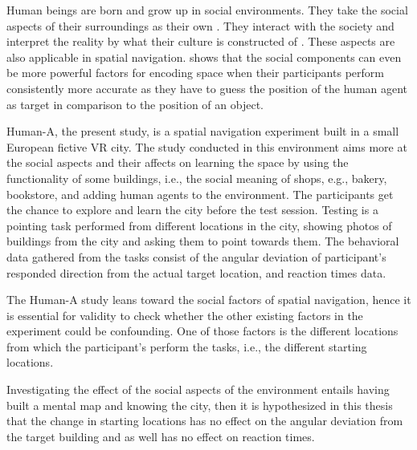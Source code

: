 Human beings are born and grow up in social environments. They take the social aspects of their surroundings as their own \autocite{berger1967luckman}. They interact with the society and interpret the reality by what their culture is constructed of \autocite{SIEGEL19759}. These aspects are also applicable in spatial navigation. \textcite{kuehn2018social} shows that the social components can even be more powerful factors for encoding space when their participants perform consistently more accurate as they have to guess the position of the human agent as target in comparison to the position of an object.

Human-A, the present study, is a spatial navigation experiment built in a small European fictive VR city. The study conducted in this environment aims more at the social aspects and their affects on learning the space by using the functionality of some buildings, i.e., the social meaning of shops, e.g., bakery, bookstore, and adding human agents to the environment. The participants get the chance to explore and learn the city before the test session. Testing is a pointing task performed from different locations in the city, showing photos of buildings from the city and asking them to point towards them. The behavioral data gathered from the tasks consist of the angular deviation of participant's responded direction from the actual target location, and reaction times data.

The Human-A study leans toward the social factors of spatial navigation, hence it is essential for validity to check whether the other existing factors in the experiment could be confounding. One of those factors is the different locations from which the participant's perform the tasks, i.e., the different starting locations. 

Investigating the effect of the social aspects of the environment entails having built a mental map and knowing the city, then it is hypothesized in this thesis that the change in starting locations has no effect on the angular deviation from the target building and as well has no effect on reaction times.
